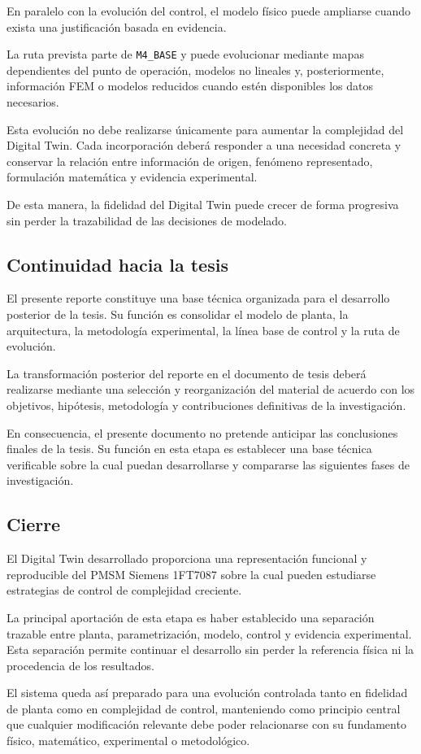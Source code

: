 En paralelo con la evolución del control, el modelo físico puede ampliarse cuando exista una justificación basada en evidencia.

La ruta prevista parte de \texttt{M4\_BASE} y puede evolucionar mediante mapas dependientes del punto de operación, modelos no lineales y, posteriormente, información FEM o modelos reducidos cuando estén disponibles los datos necesarios.

Esta evolución no debe realizarse únicamente para aumentar la complejidad del Digital Twin. Cada incorporación deberá responder a una necesidad concreta y conservar la relación entre información de origen, fenómeno representado, formulación matemática y evidencia experimental.

De esta manera, la fidelidad del Digital Twin puede crecer de forma progresiva sin perder la trazabilidad de las decisiones de modelado.

\subsection{Continuidad hacia la tesis}

El presente reporte constituye una base técnica organizada para el desarrollo posterior de la tesis. Su función es consolidar el modelo de planta, la arquitectura, la metodología experimental, la línea base de control y la ruta de evolución.

La transformación posterior del reporte en el documento de tesis deberá realizarse mediante una selección y reorganización del material de acuerdo con los objetivos, hipótesis, metodología y contribuciones definitivas de la investigación.

En consecuencia, el presente documento no pretende anticipar las conclusiones finales de la tesis. Su función en esta etapa es establecer una base técnica verificable sobre la cual puedan desarrollarse y compararse las siguientes fases de investigación.

\subsection{Cierre}

El Digital Twin desarrollado proporciona una representación funcional y reproducible del PMSM Siemens 1FT7087 sobre la cual pueden estudiarse estrategias de control de complejidad creciente.

La principal aportación de esta etapa es haber establecido una separación trazable entre planta, parametrización, modelo, control y evidencia experimental. Esta separación permite continuar el desarrollo sin perder la referencia física ni la procedencia de los resultados.

El sistema queda así preparado para una evolución controlada tanto en fidelidad de planta como en complejidad de control, manteniendo como principio central que cualquier modificación relevante debe poder relacionarse con su fundamento físico, matemático, experimental o metodológico.
